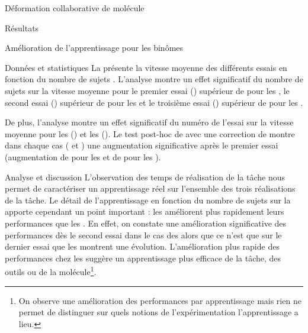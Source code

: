 \documentclass[myfrancais,ngerman,english,french]{mythesis}
\begin{document}
\begin{mychapter}{Déformation collaborative de molécule}
\begin{mysection}{Résultats}
\begin{mysubsection}{Amélioration de l'apprentissage pour les binômes}
\begin{mysubsubsection}{Données et statistiques}
					La  présente la vitesse moyenne  des différents essais  en fonction du nombre de sujets .
					L'analyse montre un effet significatif du nombre de sujets  sur la vitesse moyenne  pour le premier essai () supérieur de  pour les , le second essai () supérieur de  pour les  et le troisième essai () supérieur de  pour les .

					De plus, l'analyse montre un effet significatif du numéro de l'essai  sur la vitesse moyenne  pour les  () et les  ().
					Le test post-hoc de  avec une correction de  montre dans chaque cas ( et ) une augmentation significative après le premier essai (augmentation de  pour les  et de  pour les ).
				\end{mysubsubsection}
				\begin{mysubsubsection}{Analyse et discussion}
					L'observation des temps de réalisation de la tâche  nous permet de caractériser un apprentissage réel sur l'ensemble des trois réalisations de la tâche.
					Le détail de l'apprentissage en fonction du nombre de sujets sur la  apporte cependant un point important : les  améliorent plus rapidement leurs performances que les .
					En effet, on constate une amélioration significative des performances dès le second essai dans le cas des  alors que ce n'est que sur le dernier essai que les  montrent une évolution.
					L'amélioration plus rapide des performances chez les  suggère un apprentissage plus efficace de la tâche, des outils ou de la molécule\footnote{On observe une amélioration des performances par apprentissage mais rien ne permet de distinguer sur quels notions de l'expérimentation l'apprentissage a lieu.}.


\end{mysubsubsection}
\end{mysubsection}
\end{mysection}
\end{mychapter}
\end{document}
